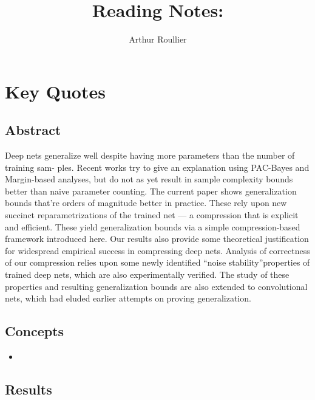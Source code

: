 \documentclass{article}
\title{Reading Notes: \cite{arora_stronger_2018}}
\author{Arthur Roullier}
\begin{document}
\maketitle




\section{Key Quotes}


\subsection{Abstract}
Deep nets generalize well despite having more parameters than the number of training sam- ples. Recent works try to give an explanation using PAC-Bayes and Margin-based analyses, but do not as yet result in sample complexity bounds better than naive parameter counting. The current paper shows generalization bounds that’re orders of magnitude better in practice. These rely upon new succinct reparametrizations of the trained net — a compression that is explicit and efficient. These yield generalization bounds via a simple compression-based framework introduced here. Our results also provide some theoretical justification for widespread empirical success in compressing deep nets.
Analysis of correctness of our compression relies upon some newly identified “noise stability”properties of trained deep nets, which are also experimentally verified. The study of these properties and resulting generalization bounds are also extended to convolutional nets, which had eluded earlier attempts on proving generalization.


\subsection{Concepts}

\begin{itemize}
	\item 
\end{itemize}


\subsection{Results}
\end{document}
